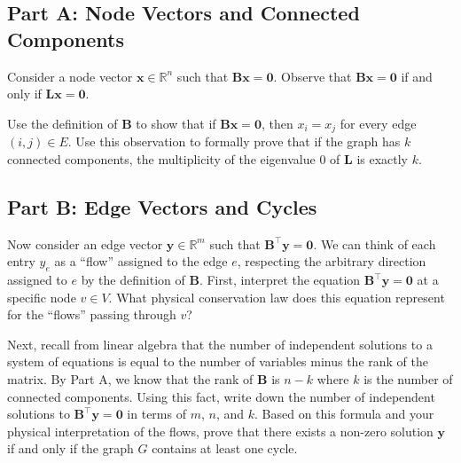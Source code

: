 \documentclass{article}
\begin{document}
\hypertarget{part-a-node-vectors-and-connected-components}{%
\subsection*{Part A: Node Vectors and Connected Components}\label{part-a-node-vectors-and-connected-components}}

Consider a node vector \(\mathbf{x} \in \mathbb{R}^n\) such that \(\mathbf{B} \mathbf{x} = \mathbf{0}\). Observe that \(\mathbf{B}\mathbf{x} = \mathbf{0}\) if and only if \(\mathbf{L}\mathbf{x} = \mathbf{0}\).

Use the definition of \(\mathbf{B}\) to show that if \(\mathbf{B}\mathbf{x} = \mathbf{0}\), then \(x_i = x_j\) for every edge \((i,j) \in E\). Use this observation to formally prove that if the graph has \(k\) connected components, the multiplicity of the eigenvalue \(0\) of \(\mathbf{L}\) is exactly \(k\).

\hypertarget{part-b-edge-vectors-and-cycles}{%
\subsection*{Part B: Edge Vectors and Cycles}\label{part-b-edge-vectors-and-cycles}}

Now consider an edge vector \(\mathbf{y} \in \mathbb{R}^m\) such that \(\mathbf{B}^\top \mathbf{y} = \mathbf{0}\). We can think of each entry \(y_e\) as a ``flow'' assigned to the edge \(e\), respecting the arbitrary direction assigned to \(e\) by the definition of \(\mathbf{B}\). First, interpret the equation \(\mathbf{B}^\top \mathbf{y} = \mathbf{0}\) at a specific node \(v \in V\). What physical conservation law does this equation represent for the ``flows'' passing through \(v\)?

Next, recall from linear algebra that the number of independent solutions to a system of equations is equal to the number of variables minus the rank of the matrix. By Part A, we know that the rank of \(\mathbf{B}\) is \(n-k\) where \(k\) is the number of connected components. Using this fact, write down the number of independent solutions to \(\mathbf{B}^\top \mathbf{y} = \mathbf{0}\) in terms of \(m\), \(n\), and \(k\). Based on this formula and your physical interpretation of the flows, prove that there exists a non-zero solution \(\mathbf{y}\) if and only if the graph \(G\) contains at least one cycle.
\end{document}

